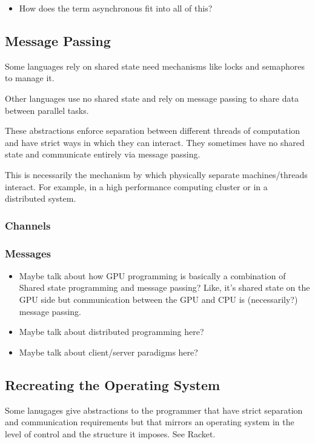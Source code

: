 \documentclass{article}
\begin{document}
\begin{itemize}
  \item How does the term asynchronous fit into all of this?
\end{itemize}

\subsection{Message Passing}
Some languages rely on shared state need mechanisms like
locks and semaphores to manage it.

Other languages use no shared state and rely on message passing to
share data between parallel tasks.

These abstractions enforce separation between different threads of
computation and have strict ways in which they can interact. They
sometimes have no shared state and communicate entirely via message
passing.

This is necessarily the mechanism by which physically separate machines/threads
interact. For example, in a high performance computing cluster or in a
distributed system.

\subsubsection{Channels}
\subsubsection{Messages}

\begin{itemize}
  \item Maybe talk about how GPU programming is basically a combination of
        Shared state programming and message passing? Like, it's shared state on
        the GPU side but communication between the GPU and CPU is (necessarily?)
        message passing.
  \item Maybe talk about distributed programming here?
  \item Maybe talk about client/server paradigms here?
\end{itemize}

\subsection{Recreating the Operating System}

Some lanugages give abstractions to the programmer that have strict
separation and communication requirements but that mirrors an operating
system in the level of control and the structure it imposes. See Racket.
\end{document}
